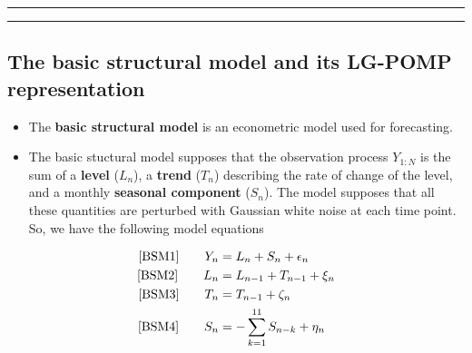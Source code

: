 \documentclass[]{article}
\begin{document}
\begin{center}\rule{0.5\linewidth}{\linethickness}\end{center}

\begin{center}\rule{0.5\linewidth}{\linethickness}\end{center}

\subsection{The basic structural model and its LG-POMP
representation}\label{the-basic-structural-model-and-its-lg-pomp-representation}

\begin{itemize}
\item
  The \textbf{basic structural model} is an econometric model used for
  forecasting.
\item
  The basic stuctural model supposes that the observation process
  \(Y_{1:N}\) is the sum of a \textbf{level} (\(L_n\)), a \textbf{trend}
  (\(T_n\)) describing the rate of change of the level, and a monthly
  \textbf{seasonal component} (\(S_n\)). The model supposes that all
  these quantities are perturbed with Gaussian white noise at each time
  point. So, we have the following model equations
\end{itemize}

\begin{align*} \mbox{[BSM1]} \quad\quad  Y_n &= L_n + S_n + \epsilon_n \\ \mbox{[BSM2]} \quad\quad  L_{n} &= L_{n-1} + T_{n-1} + \xi_n \\ \mbox{[BSM3]} \quad\quad  T_{n} &= T_{n-1} + \zeta_n \\ \mbox{[BSM4]} \quad\quad S_{n} &= -\sum_{k=1}^{11} S_{n-k} + \eta_n \end{align*}
\end{document}

